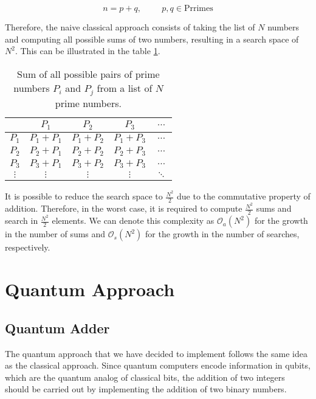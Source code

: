 \documentclass[12pt, a4paper]{article}
\begin{document}
    \begin{equation}
        n = p + q,\hspace{1cm}p,q\in\text{Prrimes}
    \end{equation}

    Therefore, the naive classical approach consists of taking the list of $N$ numbers and computing all possible sums of two numbers, resulting in a search space of $N^2$. This can be illustrated in the table \ref{tab:SumsClassical}.

    \begin{table}[h]
        \centering
        \caption{Sum of all possible pairs of prime numbers $P_i$ and $P_j$ from a list of $N$ prime numbers.}
        \label{tab:SumsClassical}
        \begin{tabular}{c|cccc}
            & $P_1$ & $P_2$ & $P_3$ & $\ldots$ \\
            \hline
        $P_1$ & $P_1 + P_1$ & $P_1 + P_2$ & $P_1 + P_3$ & $\ldots$ \\
        $P_2$ & $P_2 + P_1$ & $P_2 + P_2$ & $P_2 + P_3$ & $\ldots$ \\
        $P_3$ & $P_3 + P_1$ & $P_3 + P_2$ & $P_3 + P_3$ & $\ldots$ \\
        $\vdots$ & $\vdots$ & $\vdots$ & $\vdots$ & $\ddots$ \\
        \end{tabular}
    \end{table}

    It is possible to reduce the search space to $\frac{N^{2}}{2}$ due to the commutative property of addition. Therefore, in the worst case, it is required to compute $\frac{N^{2}}{2}$ sums and search in $\frac{N^2}{2}$ elements. We can denote this complexity as $\mathcal{O}_{a}(N^2)$ for the growth in the number of sums and $\mathcal{O}_s(N^2)$ for the growth in the number of searches, respectively.

    \section{Quantum Approach}

    \subsection{Quantum Adder}

    The quantum approach that we have decided to implement follows the same idea as the classical approach. Since quantum computers encode information in qubits, which are the quantum analog of classical bits, the addition of two integers should be carried out by implementing the addition of two binary numbers.
\end{document}
